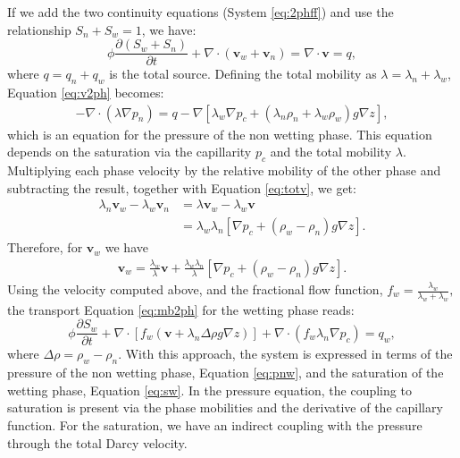 \documentclass[12pt]{article}
\begin{document}
If we add the two continuity equations (System \eqref{eq:2phff}) and use the relationship $S_n+S_w=1$, we have:
\begin{equation}\label{eq:v2ph}
 \phi\frac{\partial( {S}_{w}+S_n)}{\partial t}+\nabla \cdot ( \mathbf{v}_{w}+\mathbf{v}_n)=  \nabla \cdot \mathbf{v}=q,
\end{equation}
where $q=q_n+q_w$ is the total source. Defining the total mobility as $\lambda=\lambda_n+\lambda_w$, Equation \eqref{eq:v2ph} becomes:
\begin{align}\label{eq:pnw}
-\nabla \cdot (\lambda \nabla p_n)=q-\nabla[\lambda_w\nabla p_c+(\lambda_n\rho_n+\lambda_w\rho_w)g\nabla z],
\end{align}
which is an equation for the pressure of the non wetting phase. This equation depends on the saturation via the capillarity $p_c$ and the total mobility $\lambda$.\\
Multiplying each phase velocity by the relative mobility of the other phase and subtracting the result, together with Equation \eqref{eq:totv}, we get:
\begin{align*}
\lambda_n\mathbf{v}_w-\lambda_w\mathbf{v}_n&=\lambda\mathbf{v}_w-\lambda_w\mathbf{v}\\
&=\lambda_w\lambda_n [\nabla p_c+(\rho_w-\rho_n)g\nabla z].
\end{align*}
Therefore, for $\mathbf{v}_w$ we have
\begin{align*}
\mathbf{v}_w=\frac{\lambda_w}{\lambda}\mathbf{v}+\frac{\lambda_w\lambda_n}{\lambda} [\nabla p_c+(\rho_w-\rho_n)g\nabla z].
\end{align*}
Using the velocity computed above, and the fractional flow function,  $f_{w}=\frac{\lambda_{w}}{\lambda_{w}+\lambda_{w}},$ the transport Equation \eqref{eq:mb2ph} for the wetting phase reads:
\begin{equation}\label{eq:sw}
 \phi\frac{\partial {S}_{w}}{\partial t}+\nabla \cdot [f_w( \mathbf{v}+\lambda_n\Delta  \rho g\nabla z)]+\nabla \cdot(f_w\lambda_n\nabla p_c)= q_w,
\end{equation}
where $\Delta \rho= \rho_w-\rho_n.$
With this approach, the system is expressed in terms of the pressure of the non wetting phase, Equation \eqref{eq:pnw}, and the saturation of the wetting phase, Equation \eqref{eq:sw}.
In the pressure equation,
the coupling to saturation is present via the phase mobilities and the derivative of the capillary function. For the saturation, we have an indirect
coupling with the pressure through the total Darcy velocity. \\
\end{document}
